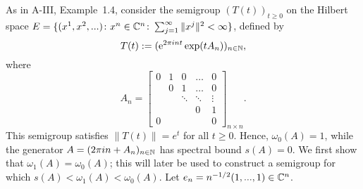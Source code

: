 \begin{example}\label{ex:a4-1.6} 
As in A-III, Example~1.4, consider the semigroup $ (T(t))_{t \geq 0} $ on the Hilbert space $ E = \{(x^1, x^2, ...) \colon x^n \in \mathbb{C}^n\colon\sum_{j=1}^{\infty} \|x^j\|^2 < \infty\} $, defined by 
\[{
T(t) := (\mathrm{e}^{2\pi i n t} \exp(t A_n))_{n \in \mathbb{N}}
},\]
where
\[
A_n =
\begin{bmatrix}
0 & 1 & 0 & \dots & 0 \\
& 0 & 1 & \dots & 0 \\
& & \ddots & \ddots & \vdots \\
& & & 0 & 1 \\
0 & & & & 0
\end{bmatrix}_{n \times n}.
\]
This semigroup satisfies $ \|T(t)\| = e^t $ for all $t\ge 0$. Hence, $ \omega_{0}(A) = 1 $, while the generator $ A = (2\pi i n + A_n)_{n \in \mathbb{N}} $ has spectral bound $ s(A) = 0 $. 
We first show that $ \omega_1(A) = \omega_{0}(A) $; this will later be used to construct a semigroup for which $ s(A) < \omega_1(A) < \omega_{0}(A) $. 
Let $ e_n = n^{-1/2} (1, ..., 1) \in \mathbb{C}^n $. 


\end{example}
